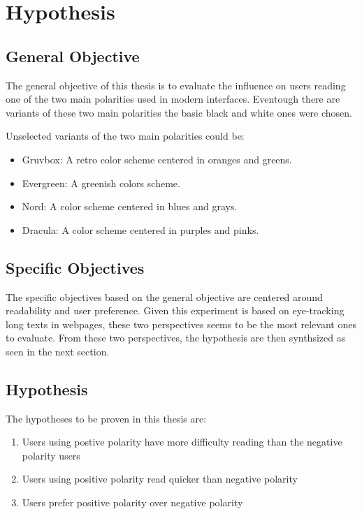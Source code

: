 \chapter{Hypothesis}
\label{chap:hypothesis}

\section{General Objective}
The general objective of this thesis is to evaluate the influence on users reading one of the two main 
polarities used in modern interfaces. Eventough there are variants of these two main polarities the basic 
black and white ones were chosen.

Unselected variants of the two main polarities could be:
\begin{itemize}
    \item Gruvbox: A retro color scheme centered in oranges and greens.
    \item Evergreen: A greenish colors scheme.
    \item Nord: A color scheme centered in blues and grays.
    \item Dracula: A color scheme centered in purples and pinks.
\end{itemize}
\section{Specific Objectives}
The specific objectives based on the general objective are centered around readability and user preference. Given this 
experiment is based on eye-tracking long texts in webpages, these two perspectives seems to be the most relevant ones to evaluate.
From these two perspectives, the hypothesis are then synthsized as seen in the next section.
\section{Hypothesis}
The hypotheses to be proven in this thesis are:
\begin{enumerate}
    \item[H1)] Users using postive polarity have more difficulty reading than the negative polarity users
    \item[H2)] Users using positive polarity read quicker than negative polarity
    \item[H3)] Users prefer positive polarity over negative polarity
\end{enumerate}



